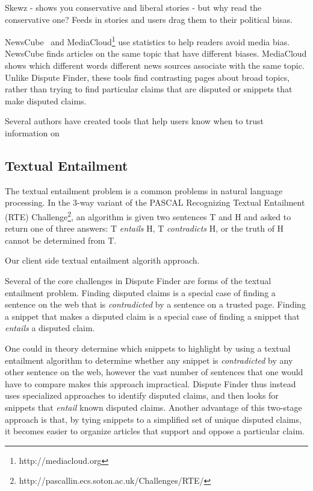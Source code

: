 Skewz - shows you conservative and liberal stories - but why read the conservative one?
Feeds in stories and users drag them to their political bisas.

NewsCube~\cite{Park2009} and MediaCloud\footnote{http://mediacloud.org} use statistics to help readers avoid media bias. NewsCube finds articles on the same topic that have different biases. MediaCloud shows which different words different news sources associate with the same topic. Unlike Dispute Finder, these tools find contrasting pages about broad topics, rather than trying to find particular claims that are disputed or snippets that make disputed claims.



Several authors have created tools that help users know when to trust information on 
% 
% 


\subsection{Textual Entailment}
\label{related:entailment}

The textual entailment problem is a common problems in natural language processing. In the 3-way variant of the PASCAL Recognizing Textual Entailment (RTE) Challenge\footnote{http://pascallin.ecs.soton.ac.uk/Challenges/RTE/}, an algorithm is given two sentences T and H and asked to return one of three answers: T {\it entails} H, T {\it contradicts} H, or the truth of H cannot be determined from T. 

Our client side textual entailment algorith approach. 


Several of the core challenges in Dispute Finder are forms of the textual entailment problem. Finding disputed claims is a special case of finding a sentence on the web that is {\it contradicted} by a sentence on a trusted page. Finding a snippet that makes a disputed claim is a special case of finding a snippet that {\it entails} a disputed claim. 

One could in theory determine which snippets to highlight by using a textual entailment algorithm to determine whether any snippet is {\it contradicted} by any other sentence on the web, however the vast number of sentences that one would have to compare makes this approach impractical. Dispute Finder thus instead uses specialized approaches to identify disputed claims, and then looks for snippets that {\it entail} known disputed claims. Another advantage of this two-stage approach is that, by tying snippets to a simplified set of unique disputed claims, it becomes easier to organize articles that support and oppose a particular claim.

